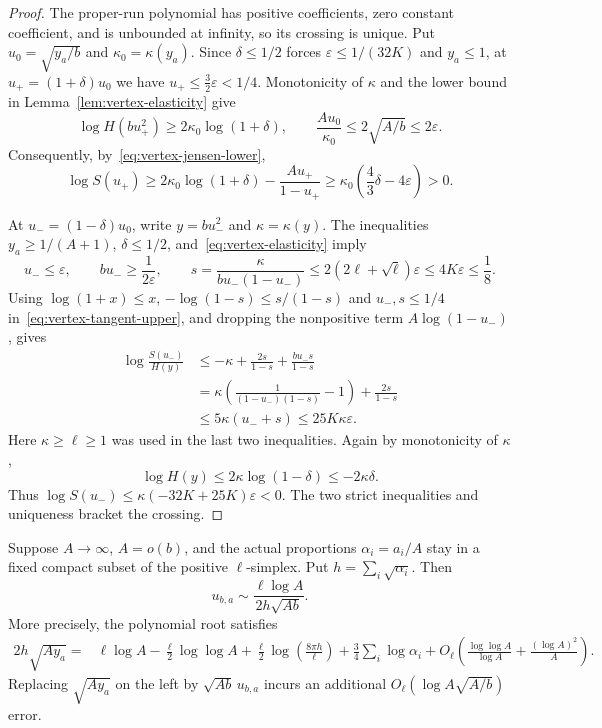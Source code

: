 \begin{proof}
The proper-run polynomial has positive coefficients, zero constant
coefficient, and is unbounded at infinity, so its crossing is unique.
Put $u_0=\sqrt{y_a/b}$ and $\kappa_0=\kappa(y_a)$.
Since $\delta\le1/2$ forces $\varepsilon\le1/(32K)$ and $y_a\le1$, at
$u_+=(1+\delta)u_0$ we have $u_+\le\tfrac32\varepsilon<1/4$.
Monotonicity of $\kappa$ and the lower bound in
Lemma~\ref{lem:vertex-elasticity} give
\[
 \log H(bu_+^2)\ge2\kappa_0\log(1+\delta),\qquad
 \frac{Au_0}{\kappa_0}\le2\sqrt{A/b}\le2\varepsilon.
\]
Consequently, by~\eqref{eq:vertex-jensen-lower},
\[
 \log S(u_+)\ge
 2\kappa_0\log(1+\delta)-\frac{Au_+}{1-u_+}
 \ge\kappa_0\left(\frac43\delta-4\varepsilon\right)>0.
\]

At $u_-=(1-\delta)u_0$, write $y=bu_-^2$ and
$\kappa=\kappa(y)$. The inequalities $y_a\ge1/(A+1)$,
$\delta\le1/2$, and~\eqref{eq:vertex-elasticity} imply
\[
 u_-\le\varepsilon,\qquad bu_-\ge\frac1{2\varepsilon},\qquad
 s=\frac{\kappa}{bu_-(1-u_-)}
 \le 2(2\ell+\sqrt\ell)\varepsilon\le4K\varepsilon\le\frac18.
\]
Using $\log(1+x)\le x$, $-\log(1-s)\le s/(1-s)$ and
$u_-,s\le1/4$ in~\eqref{eq:vertex-tangent-upper}, and dropping the
nonpositive term $A\log(1-u_-)$, gives
\begin{align*}
 \log\frac{S(u_-)}{H(y)}
 &\le -\kappa+\frac{2s}{1-s}+\frac{bu_-s}{1-s}\\
 &=\kappa\left(\frac1{(1-u_-)(1-s)}-1\right)
       +\frac{2s}{1-s}\\
 &\le 5\kappa(u_-+s)\le25K\kappa\varepsilon.
\end{align*}
Here $\kappa\ge\ell\ge1$ was used in the last two inequalities.
Again by monotonicity of $\kappa$,
\[
 \log H(y)\le2\kappa\log(1-\delta)\le-2\kappa\delta.
\]
Thus $\log S(u_-)\le\kappa(-32K+25K)\varepsilon<0$.
The two strict inequalities and uniqueness bracket the crossing.
\end{proof}

\begin{corollary}
\label{cor:vertex-shape-law}
Suppose $A\to\infty$, $A=o(b)$, and the actual proportions
$\alpha_i=a_i/A$ stay in a fixed compact subset of the positive
$\ell$-simplex. Put $h=\sum_i\sqrt{\alpha_i}$. Then
\[
 u_{b,a}\sim\frac{\ell\log A}{2h\sqrt{Ab}}.
\]
More precisely, the polynomial root satisfies
\begin{align*}
 2h\sqrt{Ay_a}
 ={}&\ell\log A-\frac\ell2\log\log A
 +\frac\ell2\log\!\left(\frac{8\pi h}{\ell}\right)
 +\frac34\sum_i\log\alpha_i
 +O_\ell\!\left(\frac{\log\log A}{\log A}
                  +\frac{(\log A)^2}{A}\right).
\end{align*}
Replacing $\sqrt{Ay_a}$ on the left by $\sqrt{Ab}\,u_{b,a}$ incurs
an additional $O_\ell(\log A\sqrt{A/b})$ error.
\end{corollary}

